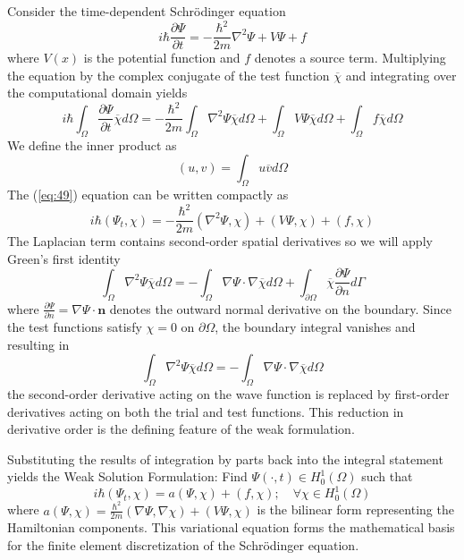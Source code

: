 \documentclass[11pt]{article}
\begin{document}
Consider the time-dependent Schrödinger equation
\begin{equation}
	i \hbar \frac{\partial\Psi}{\partial t} = - \frac{\hbar^2}{2m} \nabla^2 \Psi + V \Psi + f
\end{equation}
where $V(x)$ is the potential function and $f$ denotes a source term. Multiplying the equation by the complex conjugate of the test function $\overline{\chi}$ and integrating over the computational domain yields
\begin{equation} \label{eq:49}
	i \hbar \int_{\Omega} \frac{\partial \Psi}{\partial t} \overline{\chi} d \Omega = 
	- \frac{\hbar^2}{2m} \int_{\Omega} \nabla^2 \Psi \overline{\chi} d \Omega +
	 \int_{\Omega} V\Psi \overline{\chi} d \Omega +
	\int_{\Omega} f \overline{\chi} d \Omega
\end{equation}
We define the inner product as
\begin{equation}
	(u,v) = \int_{\Omega} u \overline{v} d \Omega
\end{equation}
The (\ref{eq:49}) equation can be written compactly as
\begin{equation}
	i \hbar (\Psi_t, \chi) = - \frac{\hbar^2}{2m} (\nabla^2 \Psi, \chi) + (V \Psi, \chi) + (f, \chi)	
\end{equation}
The Laplacian term contains second-order spatial derivatives so we will apply Green’s first identity 
\begin{equation}
	\int_{\Omega} \nabla^2 \Psi  \overline{\chi} d \Omega = - \int_{\Omega} \nabla \Psi \cdot \nabla \overline{\chi} d \Omega + \int_{\partial \Omega} \overline{\chi} \frac{\partial \Psi}{\partial n} d \Gamma
\end{equation}
where $\frac{\partial \Psi}{\partial n} = \nabla \Psi \cdot \mathbf{n}$ denotes the outward normal derivative on the boundary. Since the test functions satisfy $ \chi=0$ on $\partial \Omega$, the boundary integral vanishes and resulting in
\begin{equation}
	\int_{\Omega} \nabla^2 \Psi \overline{\chi} d \Omega = - \int_{\Omega} \nabla \Psi \cdot \nabla \overline{\chi} d \Omega
\end{equation}
the second-order derivative acting on the wave function is replaced by first-order derivatives acting on both the trial and test functions. This reduction in derivative order is the defining feature of the weak formulation.

Substituting the results of integration by parts back into the integral statement yields the Weak Solution Formulation:
Find $\Psi (\cdot, t) \in H_0^1(\Omega)$ such that
\begin{equation}
		i \hbar(\Psi_t,\chi) = a(\Psi, \chi) + (f, \chi) ; \quad \forall \chi \in H_0^1(\Omega)
\end{equation}
where $ a(\Psi,\chi) = \frac{\hbar^2}{2m} (\nabla \Psi,\nabla \chi) + (V\Psi,\chi)$ is the bilinear form representing the Hamiltonian components. This variational equation forms the mathematical basis for the finite element discretization of the Schrödinger equation.
\end{document}
